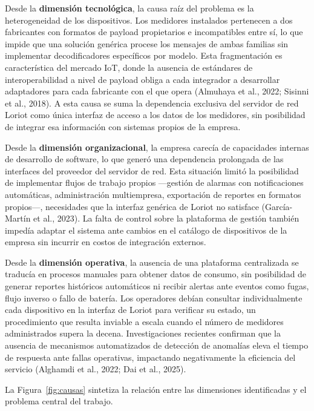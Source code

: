 \documentclass[12pt,a4paper,oneside]{report}
\begin{document}
Desde la \textbf{dimensión tecnológica}, la causa raíz del problema es la heterogeneidad de los dispositivos. Los medidores instalados pertenecen a dos fabricantes con formatos de payload propietarios e incompatibles entre sí, lo que impide que una solución genérica procese los mensajes de ambas familias sin implementar decodificadores específicos por modelo. Esta fragmentación es característica del mercado IoT, donde la ausencia de estándares de interoperabilidad a nivel de payload obliga a cada integrador a desarrollar adaptadores para cada fabricante con el que opera (Almuhaya et al., 2022; Sisinni et al., 2018). A esta causa se suma la dependencia exclusiva del servidor de red Loriot como única interfaz de acceso a los datos de los medidores, sin posibilidad de integrar esa información con sistemas propios de la empresa.

Desde la \textbf{dimensión organizacional}, la empresa carecía de capacidades internas de desarrollo de software, lo que generó una dependencia prolongada de las interfaces del proveedor del servidor de red. Esta situación limitó la posibilidad de implementar flujos de trabajo propios —gestión de alarmas con notificaciones automáticas, administración multiempresa, exportación de reportes en formatos propios—, necesidades que la interfaz genérica de Loriot no satisface (García-Martín et al., 2023). La falta de control sobre la plataforma de gestión también impedía adaptar el sistema ante cambios en el catálogo de dispositivos de la empresa sin incurrir en costos de integración externos.

Desde la \textbf{dimensión operativa}, la ausencia de una plataforma centralizada se traducía en procesos manuales para obtener datos de consumo, sin posibilidad de generar reportes históricos automáticos ni recibir alertas ante eventos como fugas, flujo inverso o fallo de batería. Los operadores debían consultar individualmente cada dispositivo en la interfaz de Loriot para verificar su estado, un procedimiento que resulta inviable a escala cuando el número de medidores administrados supera la decena. Investigaciones recientes confirman que la ausencia de mecanismos automatizados de detección de anomalías eleva el tiempo de respuesta ante fallas operativas, impactando negativamente la eficiencia del servicio (Alghamdi et al., 2022; Dai et al., 2025).

La Figura~\ref{fig:causas} sintetiza la relación entre las dimensiones identificadas y el problema central del trabajo.
\end{document}
